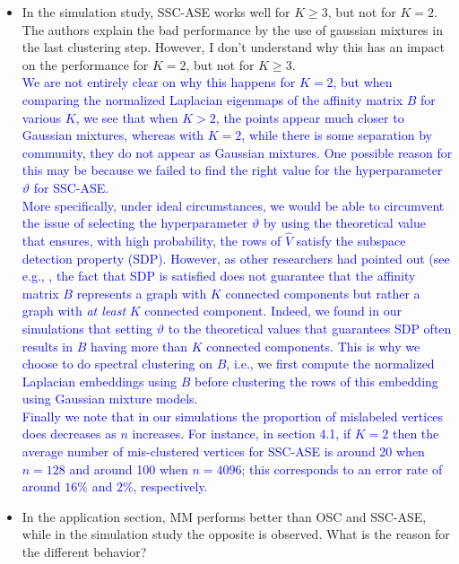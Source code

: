 \documentclass[
]{article}
\begin{document}
\begin{itemize}
{  We hope to address these topics in future research. 
  }
\item
  In the simulation study, SSC-ASE works well for \(K \geq 3\), but not
  for \(K = 2\). The authors explain the bad performance by the use of
  gaussian mixtures in the last clustering step. However, I don't
  understand why this has an impact on the performance for \(K = 2\),
  but not for \(K \geq 3\).\\
  \textcolor{blue}{
  We are not entirely clear on why this happens for $K = 2$, but when
  comparing the normalized Laplacian eigenmaps of the affinity matrix
  $B$ for various $K$, we see that when $K > 2$, the points appear much
  closer to Gaussian mixtures, whereas with $K = 2$, while there is some
  separation by community, they do not appear as Gaussian mixtures. 
  One possible reason for this may be because we failed to find the
  right value for the hyperparameter $\vartheta$ for SSC-ASE. 
  }\\
  \textcolor{blue}{
  More specifically, under ideal circumstances, we would be able to
  circumvent the issue of selecting the hyperparameter $\vartheta$ by
  using the theoretical value that ensures, with high probability, the rows of $\hat{V}$ satisfy the subspace
  detection property (SDP). However, as other researchers had pointed out (see
  e.g., \citep{sdp_sufficiency,liu_ssc}, the fact that SDP is satisfied
  does not guarantee that the affinity matrix $B$ represents a graph
  with $K$ connected components but rather a graph with {\em at least}
  $K$ connected component. Indeed, we found in our simulations that
  setting $\vartheta$ to the theoretical values that guarantees 
  SDP often results in $B$ having more than $K$ connected components.
  This is why we choose to do spectral clustering on $B$, i.e., we first
  compute the normalized Laplacian embeddings using $B$ before
  clustering the rows of this embedding using Gaussian mixture models. 
  }\\
  \textcolor{blue}{
  Finally we note that in our simulations the proportion of mislabeled
  vertices does decreases as $n$ increases. 
  For instance, in section 4.1, if $K = 2$ then the average number of mis-clustered
  vertices for SSC-ASE is around 20 when $n = 128$ and around 100 when
  $n = 4096$; this corresponds to an error rate of around $16\%$ and
  $2\%$, respectively.
  }
\item
  In the application section, MM performs better than OSC and SSC-ASE,
  while in the simulation study the opposite is observed. What is the
  reason for the different behavior?\\

\end{itemize}
\end{document}
